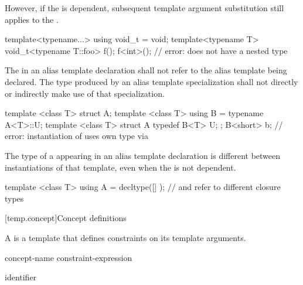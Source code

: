 \pnum
However, if the  is dependent, subsequent template
argument substitution still applies to the .
\begin{example}
\begin{codeblock}
template<typename...> using void_t = void;
template<typename T> void_t<typename T::foo> f();
f<int>();           // error:  does not have a nested type 
\end{codeblock}
\end{example}

\pnum
The  in an alias template declaration shall not refer to
the alias template being declared. The type produced by an alias template
specialization shall not directly or indirectly make use of that specialization.
\begin{example}
\begin{codeblock}
template <class T> struct A;
template <class T> using B = typename A<T>::U;
template <class T> struct A {
  typedef B<T> U;
};
B<short> b;         // error: instantiation of  uses own type via 
\end{codeblock}
\end{example}

\pnum
The type of a 
appearing in an alias template declaration
is different between instantiations of that template,
even when the  is not dependent.
\begin{example}
\begin{codeblock}
template <class T>
  using A = decltype([] { });   //  and  refer to different closure types
\end{codeblock}
\end{example}

[temp.concept]{Concept definitions}

\pnum
A  is a template
that defines constraints on its template arguments.

\begin{bnf}
\br
   concept-name  \terminal{=} constraint-expression \terminal{;}
\end{bnf}

\begin{bnf}
\br
  identifier
\end{bnf}

